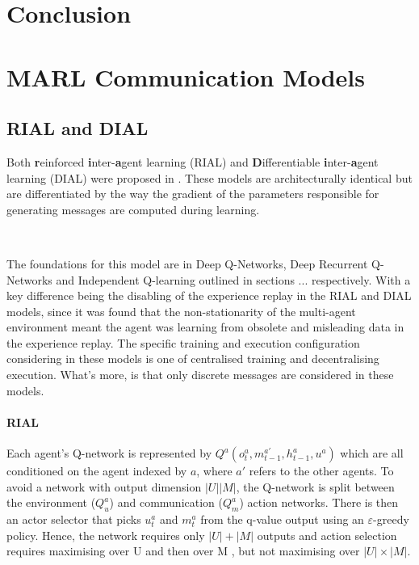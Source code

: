 \documentclass{article}
\begin{document}
\newpage

\section{Conclusion}

\newpage



\newpage

\appendix

\section{MARL Communication Models} \label{sec:models}
\subsection{RIAL and DIAL}\label{subsec:dial_rial}

Both \textbf{r}einforced \textbf{i}nter-\textbf{a}gent learning (RIAL) and \textbf{D}ifferentiable \textbf{i}nter-\textbf{a}gent learning (DIAL) were proposed in \citet{foerster2016learning}. These models are architecturally identical but are differentiated by the way the gradient of the parameters responsible for generating messages are computed during learning.

\

The foundations for this model are in Deep Q-Networks, Deep Recurrent Q-Networks and Independent Q-learning outlined in sections ... respectively. With a key difference being the disabling of the experience replay in the RIAL and DIAL models, since it was found that the non-stationarity of the multi-agent environment meant the agent was learning from obsolete and misleading data in the experience replay. The specific training and execution configuration considering in these models is one of centralised training and decentralising execution. What's more, is that only discrete messages are considered in these models. 


\paragraph{RIAL} Each agent's Q-network is represented by $Q^a(o_t^a, m_{t-1}^{a'}, h_{t-1}^{a}, u^a)$ which are all conditioned on the agent indexed by $a$, where $a'$ refers to the other agents. To avoid a network with output dimension $|U||M|$, the Q-network is split between the environment ($Q^a_u$) and communication ($Q^a_m$) action networks. There is then an actor selector that picks $u_t^a$ and $m_t^a$ from the q-value output using an $\varepsilon$-greedy policy. Hence, the network requires only $|U| + |M|$ outputs and action selection requires maximising over U and then over M , but not maximising over $|U| \times |M|$.
\end{document}

